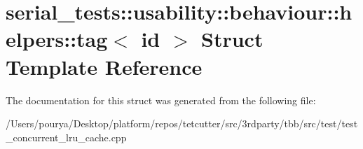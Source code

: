 \hypertarget{structserial__tests_1_1usability_1_1behaviour_1_1helpers_1_1tag}{}\section{serial\+\_\+tests\+:\+:usability\+:\+:behaviour\+:\+:helpers\+:\+:tag$<$ id $>$ Struct Template Reference}
\label{structserial__tests_1_1usability_1_1behaviour_1_1helpers_1_1tag}


The documentation for this struct was generated from the following file\+:\begin{DoxyCompactItemize}
\item 
/\+Users/pourya/\+Desktop/platform/repos/tetcutter/src/3rdparty/tbb/src/test/test\+\_\+concurrent\+\_\+lru\+\_\+cache.\+cpp\end{DoxyCompactItemize}
